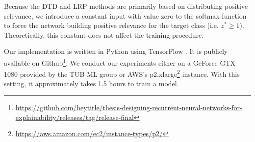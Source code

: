  Because the DTD and LRP methods are primarily  based on distributing positive relevance, we introduce a constant input with value zero to the softmax function to force the network building positive relevance for the target class (i.e.  $z^* \ge 1$). Theoretically, this constant does not affect the training procedure.

Our implementation is written in Python using TensorFlow \citep{AbadiTensorFlowLargeScaleMachine2016}. It is publicly available on Github\footnote{\url{https://github.com/heytitle/thesis-designing-recurrent-neural-networks-for-explainability/releases/tag/release-final}}.  We conduct our experiments either on a GeForce GTX 1080 provided by the TUB ML group or AWS's p2.xlarge\footnote{\url{https://aws.amazon.com/ec2/instance-types/p2/}} instance. With this setting, it approximately takes 1.5 hours to train a model.


 
%
%
%
%
%
%

